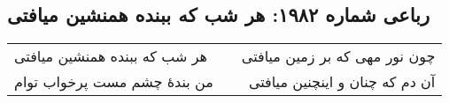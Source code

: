 \begin{center}
\section*{رباعی شماره ۱۹۸۲: هر شب که ببنده همنشین میافتی}
\label{sec:1982}
\begin{longtable}{l p{0.5cm} r}
هر شب که ببنده همنشین میافتی
&&
چون نور مهی که بر زمین میافتی
\\
من بندهٔ چشم مست پرخواب توام
&&
آن دم که چنان و اینچنین میافتی
\\
\end{longtable}
\end{center}
